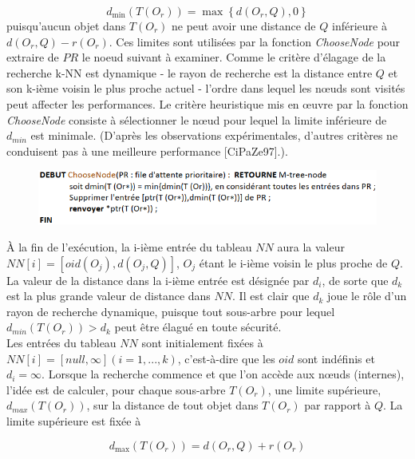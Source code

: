 \begin{equation}
    d_{\min}(T(O_r)) = \max \left\{d(O_r, Q), 0\right\}
\end{equation}
puisqu'aucun objet dans $ T(O_r) $ ne peut avoir une distance de $  Q  $ inférieure à $ d(O_r, Q)-r(O_r) $.
Ces limites sont utilisées par la fonction \textit{ChooseNode} pour extraire de $ PR $ le noeud suivant à examiner. Comme le critère d'élagage de la recherche k-NN est dynamique - le rayon de recherche est la distance entre $ Q $ et son k-ième voisin le plus proche actuel - l'ordre dans lequel les nœuds sont visités peut affecter les performances. Le critère heuristique mis en œuvre par la fonction \textit{ChooseNode} consiste à sélectionner le nœud pour lequel la limite inférieure de $ d_{min} $ est minimale. (D'après les observations expérimentales, d'autres critères ne conduisent pas à une meilleure performance [CiPaZe97].).
\begin{figure}[H]
	\centering
	\includegraphics[width=.9 \textwidth]{Figures/choosenode.png} %
\end{figure} 


À la fin de l'exécution, la i-ième entrée du tableau $ NN $ aura la valeur $ NN[i] = [oid(O_j),d(O_j, Q)] $, $ O_j $ étant le i-ième voisin le plus proche de $ Q $. La valeur de la distance dans la i-ième entrée est désignée par $ d_i $, de sorte que $ d_k $ est la plus grande valeur de distance dans $ NN $. Il est clair que $ d_k $ joue le rôle d'un rayon de recherche dynamique, puisque tout sous-arbre pour lequel $ d_{min}(T(O_r)) > d_k $ peut être élagué en toute sécurité.\\

Les entrées du tableau $ NN $ sont initialement fixées à $ NN[i] = [null ,\infty] (i= 1,..., k) $, c'est-à-dire que les $ oid $ sont indéfinis et $ d_i = \infty $. Lorsque la recherche commence et que l'on accède aux nœuds (internes), l'idée est de calculer, pour chaque sous-arbre $ T(O_r) $, une limite supérieure, $ d_{max}(T(O_r)) $, sur la distance de tout objet dans $ T(O_r) $ par rapport à $ Q $. La limite supérieure est fixée à

\begin{equation}
d_{\max}(T(O_r)) =  d(O_r, Q)+r(O_r)
\end{equation}

